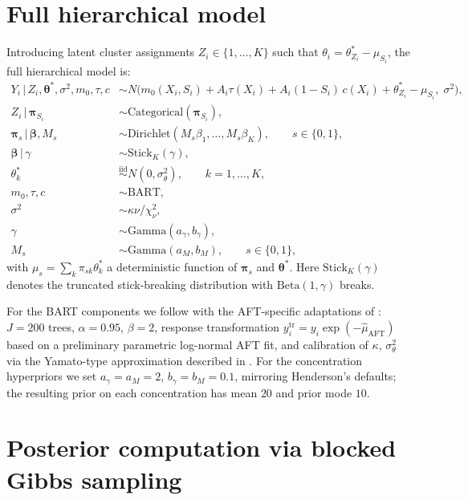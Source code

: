 \documentclass[11pt]{article}
\newcommand{\given}{\,|\,}
\newcommand{\1}{\mathbf{1}}
\begin{document}
\section{Full hierarchical model}

Introducing latent cluster assignments $Z_i \in \{1, \ldots, K\}$ such that $\theta_i = \theta_{Z_i}^* - \mu_{S_i}$, the full hierarchical model is:
\begin{align}
Y_i \given Z_i, \bm{\theta}^*, \sigma^2, m_0, \tau, c &\sim N\!\big(m_0(X_i, S_i) + A_i \tau(X_i) + A_i(1 - S_i)\, c(X_i) + \theta_{Z_i}^* - \mu_{S_i},\; \sigma^2\big), \label{eq:lik} \\
Z_i \given \bm{\pi}_{S_i} &\sim \mathrm{Categorical}(\bm{\pi}_{S_i}), \\
\bm{\pi}_s \given \bm{\beta}, M_s &\sim \mathrm{Dirichlet}(M_s \beta_1, \ldots, M_s \beta_K), \qquad s \in \{0, 1\}, \\
\bm{\beta} \given \gamma &\sim \mathrm{Stick}_K(\gamma), \\
\theta_k^* &\stackrel{\mathrm{iid}}{\sim} N(0, \sigma_\theta^2), \qquad k = 1, \ldots, K, \\
m_0, \tau, c &\sim \mathrm{BART}, \\
\sigma^2 &\sim \kappa\nu / \chi^2_\nu, \\
\gamma &\sim \mathrm{Gamma}(a_\gamma, b_\gamma), \\
M_s &\sim \mathrm{Gamma}(a_M, b_M), \qquad s \in \{0, 1\},
\end{align}
with $\mu_s = \sum_k \pi_{sk} \theta_k^*$ a deterministic function of $\bm{\pi}_s$ and $\bm{\theta}^*$. Here $\mathrm{Stick}_K(\gamma)$ denotes the truncated stick-breaking distribution with $\mathrm{Beta}(1, \gamma)$ breaks.

For the BART components we follow \citet{chipman2010bart} with the AFT-specific adaptations of \citet{henderson2020individualized}: $J = 200$ trees, $\alpha = 0.95$, $\beta = 2$, response transformation $y_i^{\mathrm{tr}} = y_i \exp(-\hat\mu_{\mathrm{AFT}})$ based on a preliminary parametric log-normal AFT fit, and calibration of $\kappa$, $\sigma_\theta^2$ via the Yamato-type approximation described in \citet[Section 2.4]{henderson2020individualized}. For the concentration hyperpriors we set $a_\gamma = a_M = 2$, $b_\gamma = b_M = 0.1$, mirroring Henderson's defaults; the resulting prior on each concentration has mean $20$ and prior mode $10$.

\section{Posterior computation via blocked Gibbs sampling}
\end{document}
